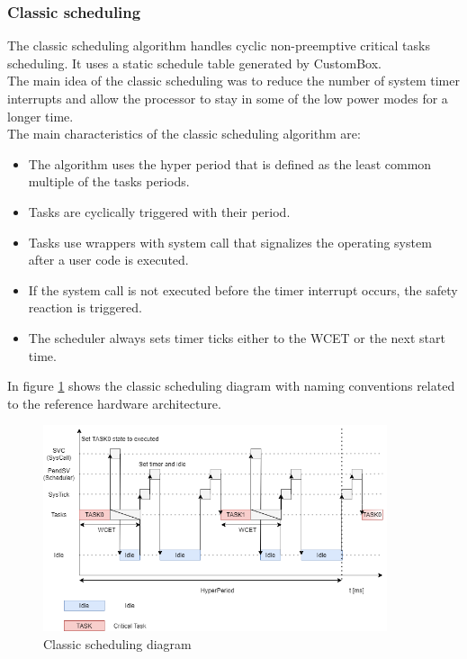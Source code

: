 \subsubsection{Classic scheduling}\label{classicScheduling}
The classic scheduling algorithm handles cyclic non-preemptive critical tasks scheduling. It uses a static schedule table generated by CustomBox. \\
\indent The main idea of the classic scheduling was to reduce the number of system timer interrupts and allow the processor to stay in some of the low power modes for a longer time.\\
\indent The main characteristics of the classic scheduling algorithm are:
\begin{itemize}
\vspace{-0.2cm}\item The algorithm uses the hyper period that is defined as the least common multiple of the tasks periods.
\vspace{-0.2cm}\item Tasks are cyclically triggered with their period.
\vspace{-0.2cm}\item Tasks use wrappers with system call that signalizes the operating system after a user code is executed.
\vspace{-0.2cm}\item If the system call is not executed before the timer interrupt occurs, the safety reaction is triggered.
\vspace{-0.2cm}\item The scheduler always sets timer ticks either to the \ac{WCET} or the next start time.
\end{itemize}
\indent In figure \ref{fig:ClassicScheduling} shows the classic scheduling diagram with naming conventions related to the reference hardware architecture.\\

\begin{figure}[H]
\begin{center}
\includegraphics[width=0.9\textwidth]{images/classic_scheduling.png}
\caption{Classic scheduling diagram}
\label{fig:ClassicScheduling}
\end{center}
\end{figure}


